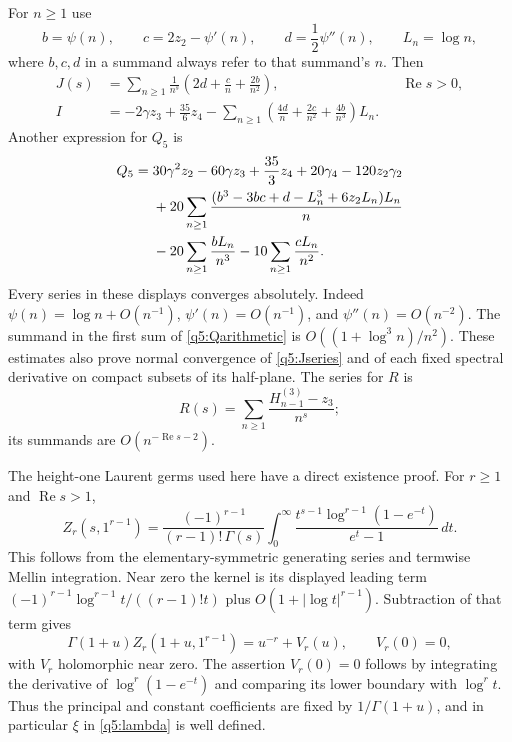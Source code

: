 \documentclass[11pt,a4paper]{article}
\numberwithin{equation}{section}
\theoremstyle{definition}
\begin{document}
For $n\geq1$ use
\begin{equation}\label{q5:integer-bcd}
 b=\psi(n),\qquad c=2z_2-\psi'(n),\qquad
 d=\frac12\psi''(n),\qquad L_n=\log n,
\end{equation}
where $b,c,d$ in a summand always refer to that summand's $n$.
Then
\begin{align}
 J(s)&=\sum_{n\geq1}\frac1{n^s}
      \left(2d+\frac{c}{n}+\frac{2b}{n^2}\right),
      &&\operatorname{Re}s>0,\label{q5:Jseries}\\
 I&=-2\gamma z_3+\frac{35}{6}z_4
       -\sum_{n\geq1}
        \left(\frac{4d}{n}+\frac{2c}{n^2}
                         +\frac{4b}{n^3}\right)L_n.
 \label{q5:Iarithmetic}
\end{align}
Another expression for $Q_5$ is
\begin{align}\label{q5:Qarithmetic}
 Q_5={}&30\gamma^2z_2-60\gamma z_3+\frac{35}{3}z_4
           +20\gamma_4-120z_2\gamma_2\notag\\
 &+20\sum_{n\geq1}
     \frac{(b^3-3bc+d-L_n^3+6z_2L_n)L_n}{n}\notag\\
 &-20\sum_{n\geq1}\frac{bL_n}{n^3}
       -10\sum_{n\geq1}\frac{cL_n}{n^2}.
\end{align}
Every series in these displays converges absolutely.  Indeed
$\psi(n)=\log n+O(n^{-1})$,
$\psi'(n)=O(n^{-1})$, and $\psi''(n)=O(n^{-2})$.
The summand in the first sum of \eqref{q5:Qarithmetic} is
$O((1+\log^3n)/n^2)$.  These estimates also prove normal convergence
of \eqref{q5:Jseries} and of each fixed spectral derivative on compact
subsets of its half-plane.  The series for $R$ is
\[
 R(s)=\sum_{n\geq1}
       \frac{H_{n-1}^{(3)}-z_3}{n^s};
\]
its summands are $O(n^{-\operatorname{Re}s-2})$.

The height-one Laurent germs used here have a direct existence proof.
For $r\geq1$ and $\operatorname{Re}s>1$,
\begin{equation}\label{q5:mellin}
 Z_r(s,1^{r-1})=
 \frac{(-1)^{r-1}}{(r-1)!\,\Gamma(s)}
 \int_0^\infty
    \frac{t^{s-1}\log^{r-1}(1-e^{-t})}{e^t-1}\,dt.
\end{equation}
This follows from the elementary-symmetric generating series and
termwise Mellin integration.  Near zero the kernel is its displayed
leading term
$(-1)^{r-1}\log^{r-1}t/((r-1)!t)$ plus
$O(1+|\log t|^{r-1})$.  Subtraction of that term gives
\[
 \Gamma(1+u)Z_r(1+u,1^{r-1})=u^{-r}+V_r(u),
 \qquad V_r(0)=0,
\]
with $V_r$ holomorphic near zero.  The assertion $V_r(0)=0$ follows
by integrating the derivative of $\log^r(1-e^{-t})$ and comparing its
lower boundary with $\log^r t$.  Thus the principal and constant
coefficients are fixed by $1/\Gamma(1+u)$, and in particular $\xi$
in \eqref{q5:lambda} is well defined.
\end{document}
